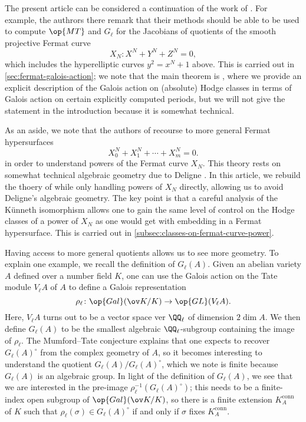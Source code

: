\documentclass[openany]{book}
\begin{document}
The present article can be considered a continuation of the work of \cite{ggl-fermat}. For example, the authrors there remark that their methods should be able to be used to compute $\op{MT}$ and $G_\ell$ for the Jacobians of quotients of the smooth projective Fermat curve
\[X_N\colon X^N+Y^N+Z^N=0,\]
which includes the hyperelliptic curves $y^2=x^N+1$ above. This is carried out in \cref{sec:fermat-galois-action}; we note that the main theorem is , where we provide an explicit description of the Galois action on (absolute) Hodge classes in terms of Galois action on certain explicitly computed periods, but we will not give the statement in the introduction because it is somewhat technical.
\begin{remark}
	As an aside, we note that the authors of \cite{ggl-fermat} recourse to more general Fermat hypersurfaces
	\[X_0^N+X_1^N+\cdots+X_m^N=0.\]
	in order to understand powers of the Fermat curve $X_N$. This theory rests on somewhat technical algebraic geometry due to Deligne \cite[Section~7]{deligne-hodge}. In this article, we rebuild the thoery of \cite{ggl-fermat} while only handling powers of $X_N$ directly, allowing us to avoid Deligne's algebraic geometry. The key point is that a careful analysis of the K\"unneth isomorphism allows one to gain the same level of control on the Hodge classes of a power of $X_N$ as one would get with embedding in a Fermat hypersurface. This is carried out in \cref{subsec:classes-on-fermat-curve-power}.
\end{remark}
Having access to more general quotients allows us to see more geometry. To explain one example, we recall the definition of $G_\ell(A)$. Given an abelian variety $A$ defined over a number field $K$, one can use the Galois action on the Tate module $V_\ell A$ of $A$ to define a Galois representation
\[\rho_\ell\colon\op{Gal}(\ov K/K)\to\op{GL}(V_\ell A).\]
Here, $V_\ell A$ turns out to be a vector space ver $\QQ_\ell$ of dimension $2\dim A$. We then define $G_\ell(A)$ to be the smallest algebraic $\QQ_\ell$-subgroup containing the image of $\rho_\ell$. The Mumford--Tate conjecture explains that one expects to recover $G_\ell(A)^\circ$ from the complex geometry of $A$, so it becomes interesting to understand the quotient $G_\ell(A)/G_\ell(A)^\circ$, which we note is finite because $G_\ell(A)$ is an algebraic group. In light of the definition of $G_\ell(A)$, we see that we are interested in the pre-image $\rho_\ell^{-1}(G_\ell(A)^\circ)$; this needs to be a finite-index open subgroup of $\op{Gal}(\ov K/K)$, so there is a finite extension $K_A^{\mathrm{conn}}$ of $K$ such that $\rho_\ell(\sigma)\in G_\ell(A)^\circ$ if and only if $\sigma$ fixes $K_A^{\mathrm{conn}}$.
\end{document}
